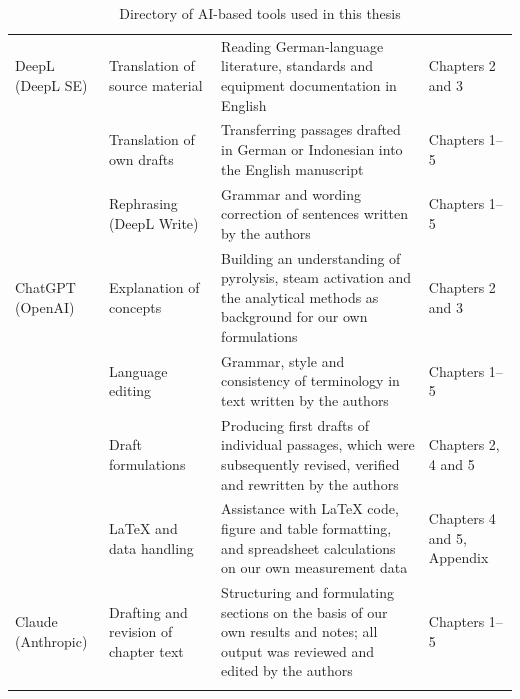 \begin{table}[H]
\centering
\caption{Directory of AI-based tools used in this thesis}
\label{tab:ai-directory}
\footnotesize
\renewcommand{\arraystretch}{1.25}
\begin{tabularx}{\textwidth}{L{2.2cm} L{3.0cm} X L{2.6cm}}
\toprule
{} &  &  &  \\
\midrule

DeepL \newline (DeepL SE) &
Translation of source material &
Reading German-language literature, standards and equipment documentation in
English &
Chapters 2 and 3 \\
\addlinespace

&
Translation of own drafts &
Transferring passages drafted in German or Indonesian into the English
manuscript &
Chapters 1--5 \\
\addlinespace

&
Rephrasing (DeepL Write) &
Grammar and wording correction of sentences written by the authors &
Chapters 1--5 \\
\addlinespace
\midrule

ChatGPT \newline (OpenAI) &
Explanation of concepts &
Building an understanding of pyrolysis, steam activation and the analytical
methods as background for our own formulations &
Chapters 2 and 3 \\
\addlinespace

&
Language editing &
Grammar, style and consistency of terminology in text written by the authors &
Chapters 1--5 \\
\addlinespace

&
Draft formulations &
Producing first drafts of individual passages, which were subsequently revised,
verified and rewritten by the authors &
Chapters 2, 4 and 5 \\
\addlinespace

&
\LaTeX{} and data handling &
Assistance with \LaTeX{} code, figure and table formatting, and spreadsheet
calculations on our own measurement data &
Chapters 4 and 5, Appendix \\
\addlinespace
\midrule

Claude \newline (Anthropic) &
Drafting and revision of chapter text &
Structuring and formulating sections on the basis of our own results and notes;
all output was reviewed and edited by the authors &
Chapters 1--5 \\
\addlinespace


\end{tabularx}
\end{table}
